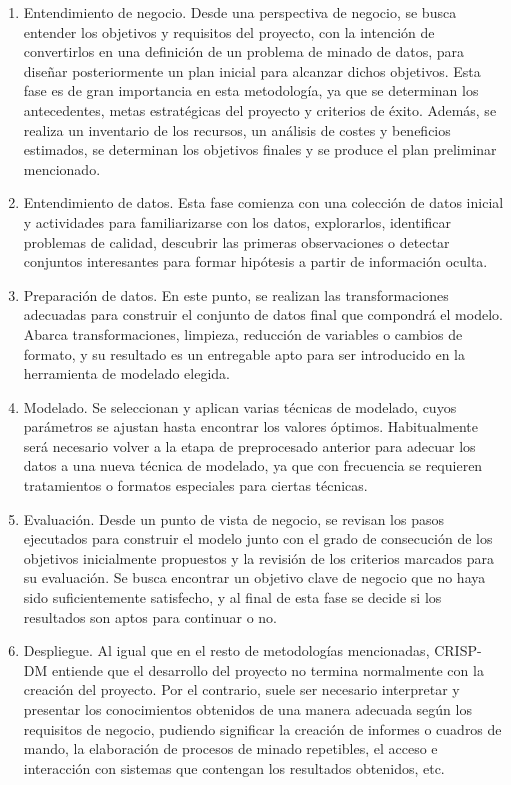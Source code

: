 \begin{enumerate}
    \item Entendimiento de negocio. Desde una perspectiva de negocio, se busca entender los objetivos y requisitos del proyecto, con la intención de convertirlos en una definición de un problema de minado de datos, para diseñar posteriormente un plan inicial para alcanzar dichos objetivos. Esta fase es de gran importancia en esta metodología, ya que se determinan los antecedentes, metas estratégicas del proyecto y criterios de éxito. Además, se realiza un inventario de los recursos, un análisis de costes y beneficios estimados, se determinan los objetivos finales y se produce el plan preliminar mencionado. 
    \item Entendimiento de datos. Esta fase comienza con una colección de datos inicial y actividades para familiarizarse con los datos, explorarlos, identificar problemas de calidad, descubrir las primeras observaciones o detectar conjuntos interesantes para formar hipótesis a partir de información oculta.
    \item Preparación de datos. En este punto, se realizan las transformaciones adecuadas para construir el conjunto de datos final que compondrá el modelo. Abarca transformaciones, limpieza, reducción de variables o cambios de formato, y su resultado es un entregable apto para ser introducido en la herramienta de modelado elegida.
    \item Modelado. Se seleccionan y aplican varias técnicas de modelado, cuyos parámetros se ajustan hasta encontrar los valores óptimos. Habitualmente será necesario volver a la etapa de preprocesado anterior para adecuar los datos a una nueva técnica de modelado, ya que con frecuencia se requieren tratamientos o formatos especiales para ciertas técnicas.
    \item Evaluación. Desde un punto de vista de negocio, se revisan los pasos ejecutados para construir el modelo junto con el grado de consecución de los objetivos inicialmente propuestos y la revisión de los criterios marcados para su evaluación. Se busca encontrar un objetivo clave de negocio que no haya sido suficientemente satisfecho, y al final de esta fase se decide si los resultados son aptos para continuar o no.
    \item Despliegue. Al igual que en el resto de metodologías mencionadas, CRISP-DM entiende que el desarrollo del proyecto no termina normalmente con la creación del proyecto. Por el contrario, suele ser necesario interpretar y presentar los conocimientos obtenidos de una manera adecuada según los requisitos de negocio, pudiendo significar la creación de informes o cuadros de mando, la elaboración de procesos de minado repetibles, el acceso e interacción con sistemas que contengan los resultados obtenidos, etc.
    
\end{enumerate}

